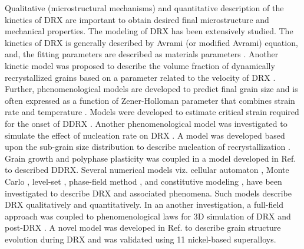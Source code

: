 \documentclass[a4paper, 11pt, dvipsnames]{article}
\begin{document}
Qualitative (microstructural mechanisms) and quantitative description of the kinetics of DRX are important to obtain desired final microstructure and mechanical properties. The modeling of DRX has been extensively studied. The kinetics of DRX is generally described by Avrami (or modified Avrami) equation, and, the fitting parameters are described as materials parameters \cite{A11, A12}. Another kinetic model was proposed to describe the volume fraction of dynamically recrystallized grains based on a parameter related to the velocity of DRX \cite{C1}. Further, phenomenological models are developed to predict final grain size and is often expressed as a function of Zener-Holloman parameter that combines strain rate and temperature \cite{A13, A14}. Models were developed to estimate critical strain required for the onset of {\small DDRX} \cite{A15, B1}. Another phenomenological model was investigated to simulate the effect of nucleation rate on DRX \cite{A16}. A model was developed based upon the sub-grain size distribution to describe nucleation of recrystallization \cite{A17}. Grain growth and polyphase plasticity was coupled in a model developed in Ref. \cite{A18} to described DDRX. Several numerical models viz. cellular automaton \cite{A16, A19, A20, A21}, Monte Carlo \cite{A22}, level-set \cite{A23}, phase-field method \cite{A24, A25, A26, A27, A28, A29, A30, A31}, and constitutive modeling \cite{B2}, have been investigated to describe DRX and associated phenomena. Such models describe DRX qualitatively and quantitatively. In an another investigation, a full-field approach was coupled to phenomenological laws for 3D simulation of DRX and post-DRX \cite{B3}. A novel model was developed in Ref. \cite{A32} to describe grain structure evolution during DRX and was validated using 11 nickel-based superalloys. 
\end{document}
